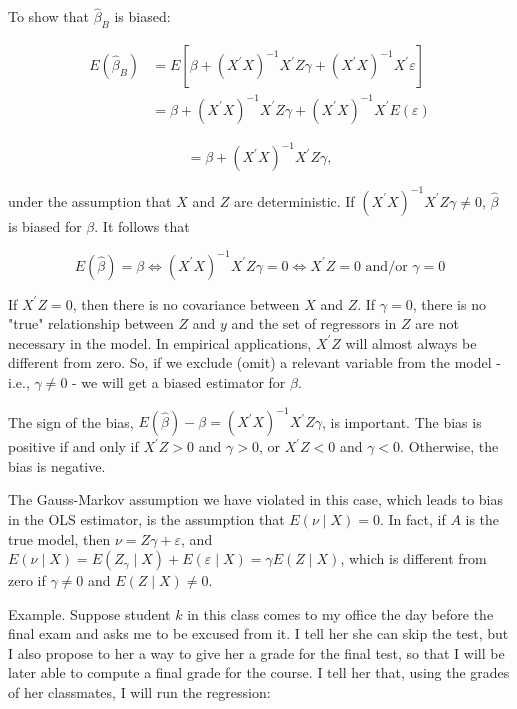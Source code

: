 To show that $\widehat{\beta}_{B}$ is biased:

$$
\begin{aligned}
E\left(\widehat{\beta}_{B}\right) & =E\left[\beta+\left(X^{\prime} X\right)^{-1} X^{\prime} Z \gamma+\left(X^{\prime} X\right)^{-1} X^{\prime} \varepsilon\right] \\
& =\beta+\left(X^{\prime} X\right)^{-1} X^{\prime} Z \gamma+\left(X^{\prime} X\right)^{-1} X^{\prime} E(\varepsilon)
\end{aligned}
$$

$$
=\beta+\left(X^{\prime} X\right)^{-1} X^{\prime} Z \gamma,
$$

under the assumption that $X$ and $Z$ are deterministic. If $\left(X^{\prime} X\right)^{-1} X^{\prime} Z \gamma \neq 0$, $\widehat{\beta}$ is biased for $\beta$. It follows that

$$
E(\widehat{\beta})=\beta \Longleftrightarrow\left(X^{\prime} X\right)^{-1} X^{\prime} Z \gamma=0 \Longleftrightarrow X^{\prime} Z=0 \text { and/or } \gamma=0
$$

If $X^{\prime} Z=0$, then there is no covariance between $X$ and $Z$. If $\gamma=0$, there is no "true" relationship between $Z$ and $y$ and the set of regressors in $Z$ are not necessary in the model. In empirical applications, $X^{\prime} Z$ will almost always be different from zero. So, if we exclude (omit) a relevant variable from the model - i.e., $\gamma \neq 0$ - we will get a biased estimator for $\beta$.

The sign of the bias, $E(\widehat{\beta})-\beta=\left(X^{\prime} X\right)^{-1} X^{\prime} Z \gamma$, is important. The bias is positive if and only if $X^{\prime} Z>0$ and $\gamma>0$, or $X^{\prime} Z<0$ and $\gamma<0$. Otherwise, the bias is negative.

The Gauss-Markov assumption we have violated in this case, which leads to bias in the OLS estimator, is the assumption that $E(\nu \mid X)=0$. In fact, if $A$ is the true model, then $\nu=Z \gamma+\varepsilon$, and $E(\nu \mid X)=E\left(Z_{\gamma} \mid X\right)+E(\varepsilon \mid X)=\gamma E(Z \mid X)$, which is different from zero if $\gamma \neq 0$ and $E(Z \mid X) \neq 0$.

Example. Suppose student $k$ in this class comes to my office the day before the final exam and asks me to be excused from it. I tell her she can skip the test, but I also propose to her a way to give her a grade for the final test, so that I will be later able to compute a final grade for the course. I tell her that, using the grades of her classmates, I will run the regression:

